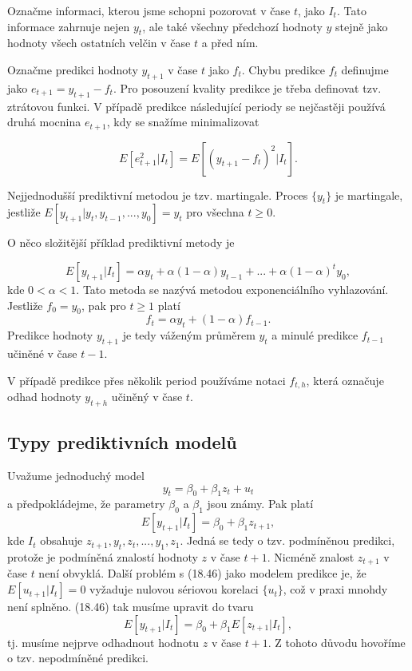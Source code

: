 Označme informaci, kterou jsme schopni pozorovat v čase $t$, jako $I_t$. Tato informace zahrnuje nejen $y_t$, ale 
také všechny předchozí hodnoty $y$ stejně jako hodnoty všech ostatních velčin v čase $t$ a před ním.

Označme predikci hodnoty $y_{t + 1}$ v čase $t$ jako $f_t$. Chybu predikce $f_t$ definujme jako $e_{t + 1} = y_{t + 
1} - f_t$. Pro posouzení kvality predikce je třeba definovat tzv. ztrátovou funkci. V případě predikce 
následující periody se nejčastěji používá druhá mocnina $e_{t + 1}$, kdy se snažíme minimalizovat

\begin{equation}
E[e^2_{t + 1} | I_t] = E[(y_{t + 1} - f_t) ^ 2 | I_t].
\end{equation}

Nejjednodušší prediktivní metodou je tzv. martingale. Proces $\{y_t\}$ je martingale, jestliže $E[y_{t + 1} | y_t, 
y_{t - 1}, ..., y_0] = y_t$ pro všechna $t \ge 0$.

O něco složitější příklad prediktivní metody je

\begin{equation}
E[y_{t + 1} | I_t] = \alpha y_t + \alpha (1 - \alpha) y_{t - 1} + ... + \alpha (1 - \alpha)^t y_0,
\end{equation}
kde $0 < \alpha < 1$. Tato metoda se nazývá metodou exponenciálního vyhlazování. Jestliže $f_0 = y_0$, pak pro 
$t \ge 1$ platí
\begin{equation}
f_t = \alpha y_t + (1 - \alpha) f_{t - 1}.
\end{equation}
Predikce hodnoty $y_{t + 1}$ je tedy váženým průměrem $y_t$ a minulé predikce $f_{t - 1}$ učiněné v čase $t - 1$.

V případě predikce přes několik period používáme notaci $f_{t,h}$, která označuje odhad hodnoty $y_{t + 
h}$ učiněný v čase $t$.

\subsection{Typy prediktivních modelů}

Uvažume jednoduchý model
\begin{equation}
y_t = \beta_0 + \beta_1 z_t + u_t
\end{equation}
a předpokládejme, že parametry $\beta_0$ a $\beta_1$ jsou známy. Pak platí
\begin{equation}
E[y_{t + 1}|I_t] = \beta_0 + \beta_1 z_{t + 1},
\end{equation}
kde $I_t$ obsahuje $z_{t + 1}, y_t, z_t, ..., y_1, z_1$. Jedná se tedy o tzv. podmíněnou predikci, protože je 
podmíněná znalostí hodnoty $z$ v čase $t + 1$. Nicméně znalost $z_{t + 1}$ v čase $t$ není obvyklá. Další 
problém s (18.46) jako modelem predikce je, že $E[u_{t + 1}|I_t] = 0$ vyžaduje nulovou sériovou korelaci $\{u_t\}$, 
což v praxi mnohdy není splněno. (18.46) tak musíme upravit do tvaru
\begin{equation}
E[y_{t + 1}|I_t] = \beta_0 + \beta_1 E[z_{t + 1}|I_t],
\end{equation}
tj. musíme nejprve odhadnout hodnotu $z$ v čase $t + 1$. Z tohoto důvodu hovoříme o tzv. nepodmíněné predikci.

